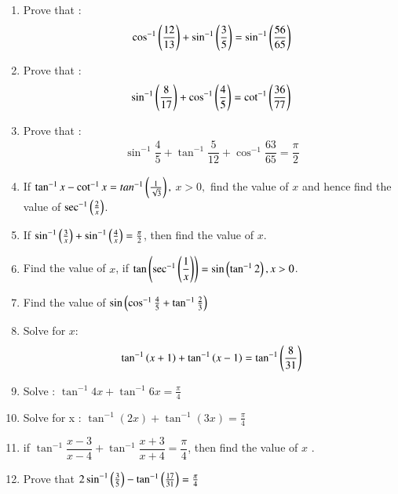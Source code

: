 \begin{enumerate}
\hfill{}\item Prove that :
	\begin{align*}
		\cos^{-1}\left(\frac{12}{13}\right)+\sin^{-1}\left(\frac{3}{5}\right)=\sin^{-1} \left(\frac{56}{65}\right)
	\end{align*}
 \hfill{}\item Prove that :
         \begin{align}
          \sin^{-1}\left(\dfrac{8}{17}\right)+\cos^{-1}\left(\dfrac{4}{5}\right)=\cot^{-1}\left(\dfrac{36}{77}\right)
         \end{align}

\hfill{}\item Prove that :
    \begin{align*}
       \sin^{-1}\dfrac{4}{5}+\tan^{-1}\dfrac{5}{12}+\cos^{-1}\dfrac{63}{65}=\dfrac{\pi}{2}
    \end{align*}

\hfill{}\item If $\tan^{-1}{x} - \cot^{-1} {x}= tan^{-1}\left(\frac{1}{\sqrt{3}}\right),$ $x > 0,$ find the value of $x$ and hence find the value of $\sec^{-1}\left(\frac{2}{x}\right)$.
 \hfill{}\item If $\sin^{-1}\left(\frac{3}{x}\right) + \sin^{-1}\left(\frac{4}{x}\right) = \frac{\pi}{2}$, then find the value of $x$.
 \hfill{}\item Find  the value of $x$, if $\tan\left(\sec^{-1}\left(\dfrac{1}{x}\right)\right)  = \sin \left(\tan^{-1}{2}\right),x>0$.

\hfill{}
\item Find the value of $\sin\left(\cos^{-1}{\frac{4}{5}}+{\tan^{-1}{\frac{2}{3}}}\right)$
\hfill{}\item Solve for $x$:
	\begin{align*}
	\tan^{-1}\left(x+1\right)+\tan^{-1}\left(x-1\right)=\tan^{-1}\left(\dfrac{8}{31}\right)
	\end{align*}
\hfill{}
\item Solve : $\tan^{-1}4x+\tan^{-1}6x=\frac{\pi}{4}$
\hfill{}
\item Solve for x :  $\tan^{-1}(2x)+\tan^{-1}(3x)=\frac{\pi}{4}$
\hfill{}

\item if $\tan^{-1}\dfrac{x-3}{x-4} + \tan^{-1}\dfrac{x+3}{x+4} =\dfrac{\pi}{4}$, then find the value of $x$ .
\hfill{}

	\item Prove that $ 2\sin^{-1} \left(\frac{3}{5}\right) - \tan^{-1} \left(\frac{17}{31}\right) = \frac{\pi}{4}$


\end{enumerate}
